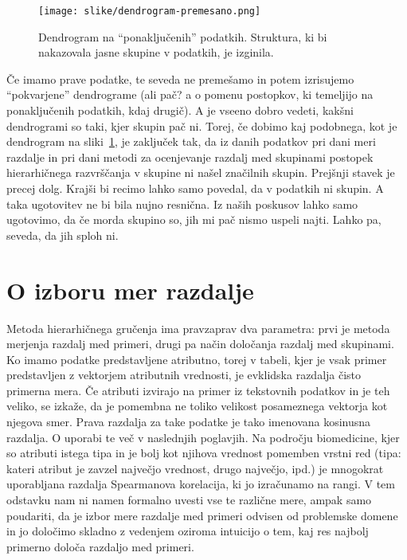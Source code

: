 \begin{figure}[htbp]
\begin{center}
\texttt{[image: slike/dendrogram-premesano.png]}
\caption{Dendrogram na ``ponaključenih'' podatkih. Struktura, ki bi
  nakazovala jasne skupine v podatkih, je izginila.}
\label{f-dendrogram-premesano}
\end{center}
\end{figure}

Če imamo prave podatke, te seveda ne premešamo in potem izrisujemo
``pokvarjene'' dendrograme (ali pač? a o pomenu postopkov, ki
temeljijo na ponaključenih podatkih, kdaj drugič). A je vseeno dobro
vedeti, kakšni dendrogrami so taki, kjer skupin pač ni. Torej, če
dobimo kaj podobnega, kot je dendrogram na
sliki~\ref{f-dendrogram-premesano}, je zaključek tak, da iz danih
podatkov pri dani meri razdalje in pri dani metodi za ocenjevanje
razdalj med skupinami postopek hierarhičnega razvrščanja v skupine ni
našel značilnih skupin. Prejšnji stavek je precej dolg. Krajši bi
recimo lahko samo povedal, da v podatkih ni skupin. A taka ugotovitev
ne bi bila nujno resnična. Iz naših poskusov lahko samo ugotovimo, da
če morda skupino so, jih mi pač nismo uspeli najti. Lahko pa, seveda,
da jih sploh ni.

\section{O izboru mer razdalje}

Metoda hierarhičnega gručenja ima pravzaprav dva parametra: prvi je metoda merjenja razdalj med primeri, drugi pa način določanja razdalj med skupinami. Ko imamo podatke predstavljene atributno, torej v tabeli, kjer je vsak primer predstavljen z vektorjem atributnih vrednosti, je evklidska razdalja čisto primerna mera. Če atributi izvirajo na primer iz tekstovnih podatkov in je teh veliko, se izkaže, da je pomembna ne toliko velikost posameznega vektorja kot njegova smer. Prava razdalja za take podatke je tako imenovana kosinusna razdalja. O uporabi te več v naslednjih poglavjih. Na področju biomedicine, kjer so atributi istega tipa in je bolj kot njihova vrednost pomemben vrstni red (tipa: kateri atribut je zavzel največjo vrednost, drugo največjo, ipd.) je mnogokrat uporabljana razdalja Spearmanova korelacija, ki jo izračunamo na rangi. V tem odstavku nam ni namen formalno uvesti vse te različne mere, ampak samo poudariti, da je izbor mere razdalje med primeri odvisen od problemske domene in jo določimo skladno z vedenjem oziroma intuicijo o tem, kaj res najbolj primerno določa razdaljo med primeri.

